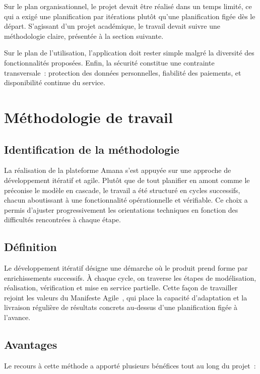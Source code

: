 \documentclass[12pt,fleqn,a4paper]{report}
\begin{document}
\begin{justify}
Sur le plan organisationnel, le projet devait être réalisé dans un temps limité, ce qui a exigé une planification par itérations plutôt qu'une planification figée dès le départ. S'agissant d'un projet académique, le travail devait suivre une méthodologie claire, présentée à la section suivante.

Sur le plan de l'utilisation, l'application doit rester simple malgré la diversité des fonctionnalités proposées. Enfin, la sécurité constitue une contrainte transversale~: protection des données personnelles, fiabilité des paiements, et disponibilité continue du service.

\section{Méthodologie de travail}

\subsection{Identification de la méthodologie}

La réalisation de la plateforme Amana s'est appuyée sur une approche de développement itératif et agile. Plutôt que de tout planifier en amont comme le préconise le modèle en cascade, le travail a été structuré en cycles successifs, chacun aboutissant à une fonctionnalité opérationnelle et vérifiable. Ce choix a permis d'ajuster progressivement les orientations techniques en fonction des difficultés rencontrées à chaque étape.

\subsection{Définition}

Le développement itératif désigne une démarche où le produit prend forme par enrichissements successifs. À chaque cycle, on traverse les étapes de modélisation, réalisation, vérification et mise en service partielle. Cette façon de travailler rejoint les valeurs du Manifeste Agile~\cite{agile_manifesto}, qui place la capacité d'adaptation et la livraison régulière de résultats concrets au-dessus d'une planification figée à l'avance.

\subsection{Avantages}

Le recours à cette méthode a apporté plusieurs bénéfices tout au long du projet~:


\end{justify}
\end{document}
